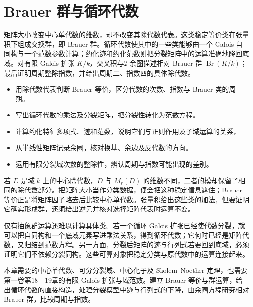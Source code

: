 
\chapter{Brauer 群与循环代数}
\label{b2:ch:18}

\begin{chapterabstract}
	矩阵大小改变中心单代数的维数，却不改变其除代数代表。这类稳定等价类在张量积下组成交换群，即 Brauer 群。循环代数使其中的一些类能够由一个 Galois 自同构与一个范数参数计算；约化迹和约化范数则把分裂矩阵中的运算准确地降回底域。对有限 Galois 扩张 \(K/k\)，交叉积与\(2\)-余圈描述相对 Brauer 群 \(\operatorname{Br}(K/k)\)；最后证明周期整除指数，并给出周期二、指数四的具体除代数。
\end{chapterabstract}

\begin{learninggoals}
	\begin{itemize}
		\item 用除代数代表判断 Brauer 等价，区分代数的次数、指数与 Brauer 类的周期。
		\item 写出循环代数的乘法及分裂矩阵，把分裂性转化为范数方程。
		\item 计算约化特征多项式、迹和范数，说明它们与正则作用及子域运算的关系。
		\item 从半线性矩阵记录余圈，核对换基、余边及反代数的方向。
		\item 运用有限分裂域次数的整除性，辨认周期与指数可能出现的差别。
	\end{itemize}
\end{learninggoals}

若 \(D\) 是域 \(k\) 上的中心除代数，\(D\) 与 \(M_r(D)\) 的维数不同，二者的模却保留了相同的除代数部分。把矩阵大小当作分类数据，便会把这种稳定信息遮住；Brauer 等价正是将矩阵因子略去后比较中心单代数。张量积给出这些类的加法，但要证明它确实形成群，还须给出逆元并核对选择矩阵代表时运算不变。

\ProseParagraphBreak

仅有抽象群运算还难以计算具体类。若一个循环 Galois 扩张已经使代数分裂，就可以把自同构和一个底域元素写进乘法关系，得到循环代数；它何时已经是矩阵代数，又归结到范数方程。另一方面，分裂后矩阵的迹与行列式若要回到底域，必须证明它们不依赖分裂同构。这些可算对象把稳定分类与原代数中的运算连接起来。

\ProseParagraphBreak

本章需要的中心单代数、可分分裂域、中心化子及 Skolem--Noether 定理，也需要第一卷第18—19章的有限 Galois 扩张与域范数。建立 Brauer 等价与群运算，给出循环代数的直接构造，处理分裂模型中迹与行列式的下降，由余圈方程研究相对 Brauer 群，比较周期与指数。

